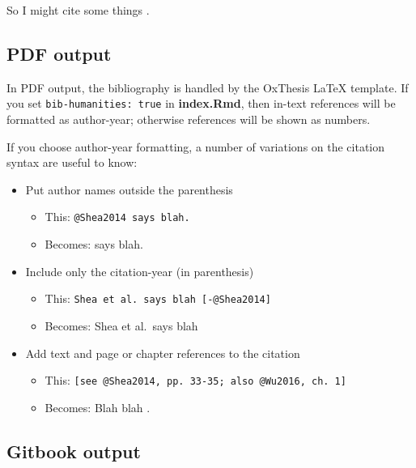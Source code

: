 \documentclass[a4paper, twoside]{templates/ociamthesis}
\providecommand{\tightlist}{%
  \setlength{\itemsep}{0pt}\setlength{\parskip}{0pt}}
\begin{document}
So I might cite some things \autocite{Shea2014,Lottridge2012}.

\hypertarget{pdf-output}{%
\subsection{PDF output}\label{pdf-output}}

In PDF output, the bibliography is handled by the OxThesis LaTeX template.
If you set \texttt{bib-humanities:\ true} in \textbf{index.Rmd}, then in-text references will be formatted as author-year; otherwise references will be shown as numbers.

If you choose author-year formatting, a number of variations on the citation syntax are useful to know:

\begin{itemize}
\tightlist
\item
  Put author names outside the parenthesis

  \begin{itemize}
  \tightlist
  \item
    This: \texttt{@Shea2014\ says\ blah.}
  \item
    Becomes: \textcite{Shea2014} says blah.
  \end{itemize}
\item
  Include only the citation-year (in parenthesis)

  \begin{itemize}
  \tightlist
  \item
    This: \texttt{Shea\ et\ al.\ says\ blah\ {[}-@Shea2014{]}}
  \item
    Becomes: Shea et al.~says blah \autocite*{Shea2014}
  \end{itemize}
\item
  Add text and page or chapter references to the citation

  \begin{itemize}
  \tightlist
  \item
    This: \texttt{{[}see\ @Shea2014,\ pp.\ 33-35;\ also\ @Wu2016,\ ch.\ 1{]}}
  \item
    Becomes: Blah blah \autocites[see][pp.~33-35]{Shea2014}[also][ch.~1]{Wu2016}.
  \end{itemize}
\end{itemize}

\hypertarget{gitbook-output}{%
\subsection{Gitbook output}\label{gitbook-output}}
\end{document}
